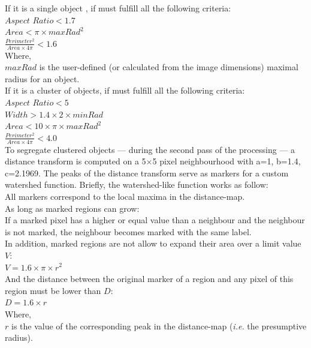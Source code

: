 \documentclass[10pt]{article}
\begin{document}
If it is a single object
, if must fulfill all the following criteria:\\
\newline{}
$Aspect$ $Ratio < 1.7$\\
$Area <  \pi\times{}{maxRad}^2$\\
{
$\frac{Perimeter^2}{Area \times{} 4\pi } < 1.6$
}
\newline{}\\
Where,\\
$maxRad$ is the user-defined (or calculated from the image dimensions) maximal radius for an object.\\

If it is a cluster of objects, if must fulfill all the following criteria:\\
\newline{}
$Aspect$ $Ratio < 5$\\
$Width > 1.4\times{}2\times{}minRad $\\
$Area < 10 \times{}\pi\times{}{maxRad}^2$\\
{
$\frac{Perimeter^2}{Area \times{} 4\pi } < 4.0$
}
\newline{}\\
\cite{vokes_using_2008}
To segregate clustered objects --- during the second pass of the processing ---
{
a distance transform is computed on a 5$\times{}$5 pixel neighbourhood with a=1, b=1.4, c=2.1969. 
}
The peaks of the distance transform serve as markers for a custom watershed
function. Briefly, the watershed-like function works as follow:\\
All markers correspond to the local maxima in the distance-map.\\
As long as marked regions can grow:\\  
If a marked pixel has a higher or equal value than a neighbour and the neighbour
is not marked, the neighbour becomes marked with the same label.\\
In addition, marked regions are not allow to expand their area over a limit value $V$:\\
 $V = 1.6\times{}\pi\times{}{r}^2$ \\
 And the distance between the original marker of a region and any pixel of this region must be lower than $D$:\\
 $D = 1.6\times{}{r}$\\
 \newline{}
 Where,\\
 $r$ is the value of the corresponding peak in the distance-map (\emph{i.e.} the
 presumptive radius).
 
\end{document}
